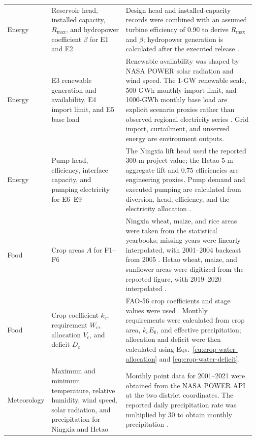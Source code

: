 \documentclass [a4paper,fleqn] {cas-dc}
\begin{document}
\begin{table}[pos=t]
\begin{tabularx}{\textwidth}{@{}>{\raggedright\arraybackslash}p{}
  >{\raggedright\arraybackslash}p{}
  >{\raggedright\arraybackslash}X@{}}
Energy & Reservoir head, installed capacity, $R_{\max}$, and hydropower
coefficient $\beta$ for E1 and E2 & Design head and installed-capacity records
were combined with an assumed turbine efficiency of 0.90 to derive $R_{\max}$
and $\beta$; hydropower generation is calculated after the executed release
\citep{LongyangxiaNEA2018,Zhang2021Longyangxia,Yin2021YellowRiver}. \\

Energy & E3 renewable generation and availability, E4 import limit, and E5
base load & Renewable availability was shaped by NASA POWER solar radiation and
wind speed. The 1-GW renewable scale, 500-GWh monthly import limit, and
1000-GWh monthly base load are explicit scenario proxies rather than observed
regional electricity series \citep{NASAPOWER}. Grid import, curtailment, and
unserved energy are environment outputs. \\

Energy & Pump head, efficiency, interface capacity, and pumping electricity for
E6--E9 & The Ningxia lift head used the reported 300-m project value; the Hetao
5-m aggregate lift and 0.75 efficiencies are engineering proxies. Pump demand
and executed pumping are calculated from diversion, head, efficiency, and the
electricity allocation \citep{Hongsibu2025Pumping,Liao2022CanalScheduling}. \\

Food & Crop areas $A$ for F1--F6 & Ningxia wheat, maize, and rice areas were
taken from the statistical yearbooks; missing years were linearly interpolated,
with 2001--2004 backcast from 2005 \citep{NingxiaStatisticalYearbooks}. Hetao
wheat, maize, and sunflower areas were digitized from the reported figure, with
2019--2020 interpolated \citep{Feng2025Hetao}. \\

Food & Crop coefficient $k_c$, requirement $W_c$, allocation $V_c$, and deficit
$D_c$ & FAO-56 crop coefficients and stage values were used
\citep{Allen1998FAO56}. Monthly requirements were calculated from crop area,
$k_c E_0$, and effective precipitation; allocation and deficit were then
calculated using Eqs.~\eqref{eq:crop-water-allocation} and
\eqref{eq:crop-water-deficit}. \\

Meteorology & Maximum and minimum temperature, relative humidity, wind speed,
solar radiation, and precipitation for Ningxia and Hetao & Monthly point data
for 2001--2021 were obtained from the NASA POWER API at the two district
coordinates. The reported daily precipitation rate was multiplied by 30 to
obtain monthly precipitation \citep{NASAPOWER}. \\


\end{tabularx}
\end{table}
\end{document}
